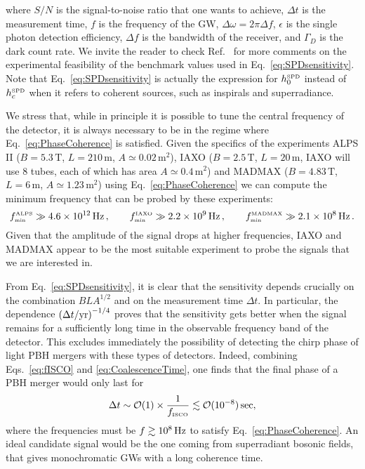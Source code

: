 \documentclass[11pt,a4paper]{article}
\begin{document}
where $S/N$ is the signal-to-noise ratio that one wants to achieve, $\Delta t$ is the measurement time, $f$ is the frequency of the GW, $\Delta \omega = 2 \pi \Delta f$, $\epsilon$ is the single photon detection efficiency, $\Delta f$ is the bandwidth of the receiver, and $\Gamma_D$ is the dark count rate. We invite the reader to check Ref.~\cite{Ringwald:2020ist} for more comments on the experimental feasibility of the benchmark values used in Eq.~\eqref{eq:SPDsensitivity}. Note that Eq.~\eqref{eq:SPDsensitivity} is actually the expression for $h_0^\text{\tiny SPD}$ instead of $h_c^\text{\tiny SPD}$ when it refers to coherent sources, such as inspirals and superradiance.


We stress that, while in principle it is possible to tune the central frequency of the detector, it is always necessary to be in the regime where Eq.~\eqref{eq:PhaseCoherence} is satisfied. Given the specifics of the experiments ALPS II ($B = 5.3 \,\text{T}$, $L = 210 \, \text{m}$, $A \simeq 0.02 \, \text{m}^2$), IAXO ($B = 2.5 \,\text{T}$, $L = 20 \, \text{m}$, IAXO will use $8$ tubes, each of which has area $A \simeq 0.4 \, \text{m}^2$) and MADMAX ($B = 4.83 \,\text{T}$, $L = 6 \, \text{m}$, $A \simeq 1.23 \, \text{m}^2$) using Eq.~\eqref{eq:PhaseCoherence} we can compute the minimum frequency that can be probed by these experiments:
\begin{equation}
\label{eq:CutoffFrequency}
f_\text{\tiny min}^{\text{\tiny ALPS}} 
\gg 4.6 \times 10^{12} \, {\rm Hz} \,, 
\qquad 
f_\text{\tiny min}^{\text{\tiny  IAXO}} 
\gg 2.2 \times 10^{9} \, {\rm Hz} \,, \qquad f_\text{\tiny min}^{\text{\tiny  MADMAX}} 
\gg 2.1 \times 10^{8} \, {\rm Hz} \,.
\end{equation}
Given that the amplitude of the signal drops at higher frequencies, IAXO and MADMAX appear to be the most suitable experiment to probe the signals that we are interested in.

From Eq.~\eqref{eq:SPDsensitivity}, it is clear that the sensitivity depends crucially on the combination $B L A^{1/2}$ and on the measurement time $\Delta t$. 
In particular, the dependence $\left({\Delta t}/{\rm yr }\right)^{-1/4}$ proves that the sensitivity gets better when the signal remains for a sufficiently long time 
in the observable frequency band of the detector. 
This excludes immediately the possibility of detecting the chirp phase of light PBH mergers with these types of detectors.
Indeed, combining Eqs.~\eqref{eq:fISCO} and \eqref{eq:CoalescenceTime}, one finds that the final phase of a PBH merger would only last for 
\begin{equation}
	\Delta t \sim {\cal O}(1) \times \frac{1}{f_\text{\tiny ISCO}} 
	\lesssim {\cal O}(10^{-8}) \, {\rm sec},
\end{equation} 
where the frequencies must be $f \gtrsim 10^{8} \, {\rm Hz}$ to satisfy Eq.~\eqref{eq:PhaseCoherence}. 
An ideal candidate signal would be the one coming from superradiant bosonic fields, that gives monochromatic GWs
with a long coherence time.
\end{document}
